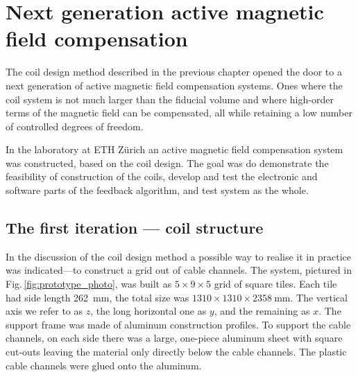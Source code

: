 \chapter{Next generation active magnetic field compensation}
\label{ch:sfc-prototype}

The coil design method described in the previous chapter opened the door to a next generation of active magnetic field compensation systems. Ones where the coil system is not much larger than the fiducial volume and where high-order terms of the magnetic field can be compensated, all while retaining a low number of controlled degrees of freedom.


In the laboratory at ETH Zürich an active magnetic field compensation system was constructed, based on the coil design. The goal was do demonstrate the feasibility of construction of the coils, develop and test the electronic and software parts of the feedback algorithm, and test system as the whole.



\section{The first iteration --- coil structure}
In the discussion of the coil design method a possible way to realise it in practice was indicated---to construct a grid out of cable channels. The system, pictured in Fig.\,\ref{fig:prototype_photo}, was built as $5 \times 9 \times 5$ grid of square tiles. Each tile had side length \SI{262}{\milli\meter}, the total size was $1310 \times 1310 \times \SI{2358}{\milli\meter}$. The vertical axis we refer to as $z$, the long horizontal one as $y$, and the remaining as $x$. The support frame was made of aluminum construction profiles. To support the cable channels, on each side there was a large, one-piece aluminum sheet with square cut-outs leaving the material only directly below the cable channels. The plastic cable channels were glued onto the aluminum.

